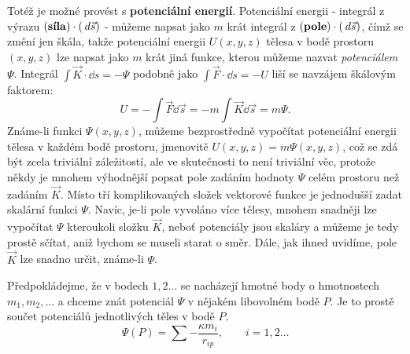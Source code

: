 {    Totéž je možné provést s \textbf{potenciální energií}. Potenciální energii - integrál z výrazu 
    \((\text{\textbf{síla}})\cdot(\hspace{2pt}d\vec{s})\) - můžeme napsat jako \(m\) krát integrál z 
    \((\text{\textbf{pole}})\cdot(\hspace{2pt}d\vec{s})\), čímž se změní jen škála, takže potenciální 
    energii \(U(x, y, z)\) tělesa v bodě prostoru \((x, y, z)\) lze napsat jako \(m\) krát jiná 
    funkce, kterou můžeme nazvat \emph{potenciálem} \(\Psi\). Integrál \(\int\vec{K}\cdot\dd{s}= 
    -\Psi\) podobně jako \(\int\vec{F}\cdot\dd{s}= -U\) liší se navzájem škálovým faktorem:
    \begin{equation}\label{FYZ:eq002}
      U = -\int\vec{F}\dd{\vec{s}} = -m\int\vec{K}\dd{\vec{s}} = m\Psi.
    \end{equation}
    Známe-li funkci \(\Psi(x, y, z)\), můžeme bezprostředně vypočítat potenciální energii tělesa v 
    každém bodě prostoru, jmenovitě \(U(x, y, z) = m\Psi(x, y, z)\), což se zdá být zcela triviální 
    záležitostí, ale ve skutečnosti to není triviální věc, protože někdy je mnohem výhodnější 
    popsat pole zadáním hodnoty \(\Psi\) celém prostoru než zadáním \(\vec{K}\). Místo tří 
    komplikovaných složek vektorové funkce je jednodušší zadat skalární funkci \(\Psi\). Navíc, 
    je-li pole vyvoláno více tělesy, mnohem snadněji lze vypočítat \(\Psi\) kteroukoli složku 
    \(\vec{K}\), neboť potenciály jsou skaláry a můžeme je tedy prostě sčítat, aniž bychom se 
    museli starat o směr. Dále, jak ihned uvidíme, pole \(\vec{K}\) lze snadno určit, známe-li 
    \(\Psi\).
    
    Předpokládejme, že v bodech \(1, 2 \ldots\) se nacházejí hmotné body o hmotnostech \(m_1, m_2, 
    \ldots\) a chceme znát potenciál \(\Psi\) v nějakém libovolném bodě \(P\). Je to prostě součet 
    potenciálů jednotlivých těles v bodě \(P\).
    \begin{equation}\label{FYZ:eq003}
      \Psi(P) = \sum-\frac{\kappa m_i}{r_{ip}}, \qquad i = 1, 2 \ldots
    \end{equation}
    
}
